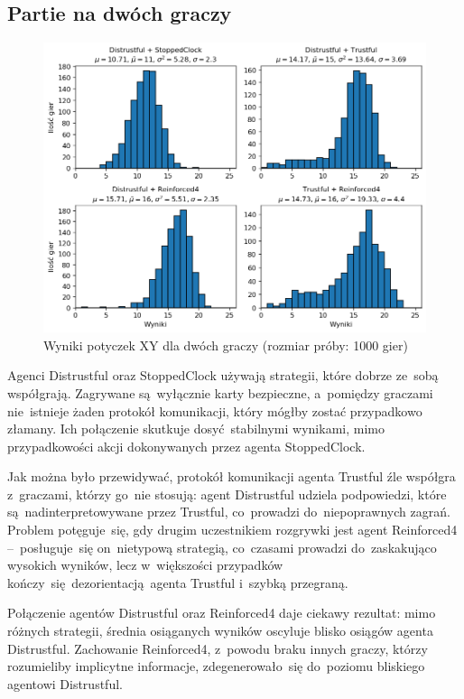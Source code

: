 \documentclass[declaration,shortabstract,inz]{iithesis}
\begin{document}
\subsection{Partie na dwóch graczy}

\begin{figure}[H]
	\centering
	\captionsetup{format=hang}
	\includegraphics[width=\textwidth,height=\textheight,keepaspectratio]{XY2.png}
	\caption[Caption]{Wyniki potyczek XY dla dwóch graczy (rozmiar próby: 1000 gier)}
	\label{fig:XY2}
\end{figure}

Agenci Distrustful oraz StoppedClock używają strategii, które dobrze ze~sobą współgrają. Zagrywane są~wyłącznie karty bezpieczne, a~pomiędzy graczami nie~istnieje żaden protokół komunikacji, który mógłby zostać przypadkowo złamany. Ich połączenie skutkuje dosyć stabilnymi wynikami, mimo przypadkowości akcji dokonywanych przez agenta StoppedClock.

Jak można było przewidywać, protokół komunikacji agenta Trustful źle współgra z~graczami, którzy go~nie stosują: agent Distrustful udziela podpowiedzi, które są~nadinterpretowywane przez Trustful, co~prowadzi do~niepoprawnych zagrań. Problem potęguje~się, gdy drugim uczestnikiem rozgrywki jest agent Reinforced4 --~posługuje~się on~nietypową strategią, co~czasami prowadzi do~zaskakująco wysokich wyników, lecz w~większości przypadków kończy~się dezorientacją agenta Trustful i~szybką przegraną.

Połączenie agentów Distrustful oraz Reinforced4 daje ciekawy rezultat: mimo różnych strategii, średnia osiąganych wyników oscyluje blisko osiągów agenta Distrustful. Zachowanie Reinforced4, z~powodu braku innych graczy, którzy rozumieliby implicytne informacje, zdegenerowało~się do~poziomu bliskiego agentowi Distrustful.
\end{document}
